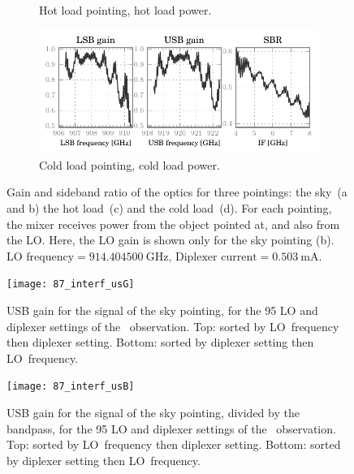 \begin{figure}[p]
\begin{subfigure}[b]{\textwidth}
        \vspace{-.8em}
        \caption{Hot load pointing, hot load power.}
    \end{subfigure}
    \begin{subfigure}[b]{\textwidth}
        \centering
        \includegraphics[scale=.9]{87_00_00_cbb_s_lsbusbsbr}
        \vspace{-.8em}
        \caption{Cold load pointing, cold load power.}
    \end{subfigure}
    \caption{Gain and sideband ratio of the optics for three pointings:
    the sky~(a and b)
    the hot load~(c)
    and the cold load~(d).
    For each pointing, the mixer receives power from the object pointed at, and also from the LO.
    Here, the LO gain is shown only for the sky pointing (b).
    $\text{LO~frequency} = \SI{914.404500}{\giga\hertz}$,
    $\text{Diplexer current} = \SI{0.503}{\milli\ampere}$.
    }
    \label{fig:87_00_00_sky_lsbusbsbr}
\end{figure}

\begin{figure}
    \centering
    \texttt{[image: 87\_interf\_usG]}
    \caption{USB gain for the signal of the sky pointing, for the 95 LO and diplexer settings of the~ observation.
    Top: sorted by LO~frequency then diplexer setting.
    Bottom: sorted by diplexer setting then LO~frequency.}
    \label{fig:87_interf_usG}
\end{figure}
\begin{figure}
    \centering
    \texttt{[image: 87\_interf\_usB]}
    \caption{USB gain for the signal of the sky pointing, divided by the bandpass, for the 95 LO and diplexer settings of the~ observation.
    Top: sorted by LO~frequency then diplexer setting.
    Bottom: sorted by diplexer setting then LO~frequency.}
    \label{fig:87_interf_usB}
\end{figure}

